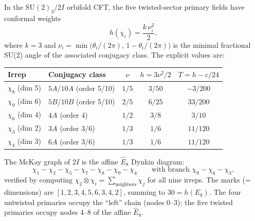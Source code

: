\begin{theorem}
\label{P5:thm:twisted_weights}
In the $\mathrm{SU}(2)_3/2I$ orbifold CFT, the five twisted-sector primary
fields have conformal weights
\begin{equation}
  h(\chi_i) = \frac{k\,\nu_i^2}{2},
  \label{P5:eq:twisted_weights}
\end{equation}
where $k=3$ and $\nu_i = \min\!\bigl(\theta_i/(2\pi),\,1-\theta_i/(2\pi)\bigr)$
is the minimal fractional SU(2) angle of the associated conjugacy class.
The explicit values are:
\begin{center}
\renewcommand{\arraystretch}{1.35}
\begin{tabular}{llccc}
\toprule
Irrep & Conjugacy class & $\nu$ & $h = 3\nu^2/2$ & $T = h - c/24$ \\
\midrule
$\chi_8$ (dim 5) & $5A$/$10A$ (order 5/10) & $1/5$ & $3/50$  & $-3/200$ \\
$\chi_9$ (dim 6) & $5B$/$10B$ (order 5/10) & $2/5$ & $6/25$  & $33/200$ \\
$\chi_6$ (dim 4) & $4A$ (order 4)           & $1/2$ & $3/8$   & $3/10$   \\
$\chi_3$ (dim 2) & $3A$ (order 3/6)         & $1/3$ & $1/6$   & $11/120$ \\
$\chi_4$ (dim 3) & $6A$ (order 3/6)         & $1/3$ & $1/6$   & $11/120$ \\
\bottomrule
\end{tabular}
\end{center}
\end{theorem}

\begin{remark}
\label{P5:subsec:mckay_graph}
The McKay graph of $2I$ is the affine $\hat{E}_8$ Dynkin diagram:
\begin{equation}
  \chi_1 - \chi_2 - \chi_5 - \chi_7 - \chi_8 - \chi_9 - \chi_4
  \qquad \text{with branch } \chi_9 - \chi_6 - \chi_3,
  \label{P5:eq:e8_quiver}
\end{equation}
verified by computing $\chi_2\otimes\chi_i=\sum_{\text{neighbors}}\chi_j$
for all nine irreps. The marks (= dimensions) are $[1,2,3,4,5,6,3,4,2]$,
summing to $30=h(E_8)$. The four untwisted primaries occupy the
``left'' chain (nodes 0--3); the five twisted primaries occupy nodes
4--8 of the affine $\hat{E}_8$.
\end{remark}

